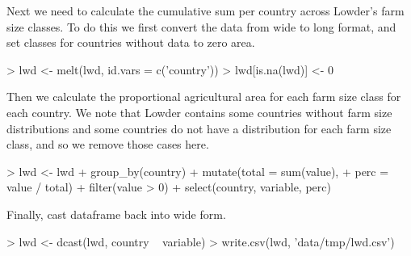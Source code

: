 \documentclass{article}
\begin{document}
\begin{Schunk}
\end{Schunk}

Next we need to calculate the cumulative sum per country across Lowder's farm size classes.  To do this we first convert the data from wide to long format, and set classes for countries without data to zero area.

\begin{Schunk}
\begin{Sinput}
> lwd <- melt(lwd, id.vars = c('country'))
> lwd[is.na(lwd)] <- 0
\end{Sinput}
\end{Schunk}

Then we calculate the proportional agricultural area for each farm size class for each country. We note that Lowder contains some countries without farm size distributions and some countries do not have a distribution for each farm size class, and so we remove those cases here.

\begin{Schunk}
\begin{Sinput}
> lwd <- lwd %>% 
+   group_by(country) %>% 
+   mutate(total = sum(value),
+          perc = value / total) %>%
+    filter(value > 0) %>%
+   select(country, variable, perc)
\end{Sinput}
\end{Schunk}

Finally, cast dataframe back into wide form.
\begin{Schunk}
\begin{Sinput}
> lwd <- dcast(lwd, country ~ variable)
> write.csv(lwd, 'data/tmp/lwd.csv')
\end{Sinput}
\end{Schunk}

\end{document}
